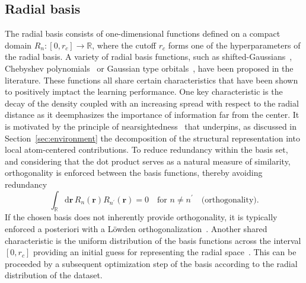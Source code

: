 \subsection{Radial basis}
\label{sec:radial_basis_set}
The radial basis consists of one-dimensional functions defined on a compact domain $R_n:[0, r_c]\rightarrow\mathbb{R}$, where the cutoff $r_c$ forms one of the hyperparameters of the radial basis.
A variety of radial basis functions, such as shifted-Gaussians~\cite{bartok2013representing}, Chebyshev polynomials~\cite{shapeev2016moment,drautz2019atomic} or Gaussian type orbitals~\cite{musil2021efficient}, have been proposed in the literature.
These functions all share certain characteristics that have been shown to positively imptact the learning performance. 
One key characteristic is the decay of the density   
 coupled with an increasing spread with respect to the radial distance as it deemphasizes the importance of information far from the center.
 It is motivated by the principle of nearsightedness~\cite{prodan2005nearsightedness} that underpins, as discussed in Section~\ref{sec:environment} the decomposition of the structural representation into local atom-centered contributions.
To reduce redundancy within the basis set, and considering that the dot product serves as a natural measure of similarity, orthogonality is enforced between the basis functions, thereby avoiding redundancy
\begin{equation}
  \int_\mathbb{R}\mathrm{d}\mathbf{r}\,R_n(\mathbf{r})R_{n^\prime}(\mathbf{r}) = 0\quad\textrm{for }n\neq n^\prime\quad \text{(orthogonality)}.
\end{equation}
If the chosen basis does not inherently provide orthogonality, it is typically enforced a posteriori %
with a Löwden orthogonalization~\cite{PIELA2014e99}.
Another shared characteristic is the uniform distribution of the basis functions across the interval $[0, r_c]$ providing an initial guess for representing the radial space~\cite{schutt2018schnet,musil2021efficient,dusson2022atomic}.
This can be proceeded by a subsequent optimization step of the basis according to the radial distribution of the dataset.
